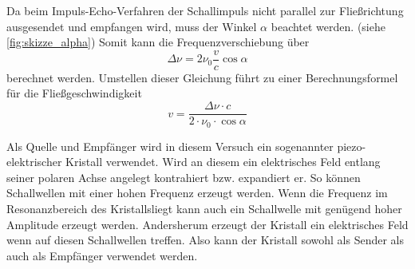 Da beim Impuls-Echo-Verfahren der Schallimpuls nicht parallel zur Fließrichtung ausgesendet und empfangen wird, muss der Winkel $\alpha$ beachtet werden. (siehe \autoref{fig:skizze_alpha})
Somit kann die Frequenzverschiebung über
\begin{equation}
    \Delta \nu = 2 \nu_0 \frac{v}{c} \cos \alpha
    \label{eq:Frequenzverschiebung}
\end{equation}
berechnet werden.
Umstellen dieser Gleichung führt zu einer Berechnungsformel für die Fließgeschwindigkeit
\begin{equation}
    v = \frac{\Delta \nu \cdot c}{2 \cdot \nu_0 \cdot \cos \alpha}
    \label{eq:geschwindigkeit}
\end{equation}

Als Quelle und Empfänger wird in diesem Versuch ein sogenannter piezo-elektrischer Kristall verwendet.
Wird an diesem ein elektrisches Feld entlang seiner polaren Achse angelegt kontrahiert bzw. expandiert er.
So können Schallwellen mit einer hohen Frequenz erzeugt werden.
Wenn die Frequenz im Resonanzbereich des Kristallsliegt kann auch ein Schallwelle mit genügend hoher Amplitude erzeugt werden.
Andersherum erzeugt der Kristall ein elektrisches Feld wenn auf diesen Schallwellen treffen.
Also kann der Kristall sowohl als Sender als auch als Empfänger verwendet werden.